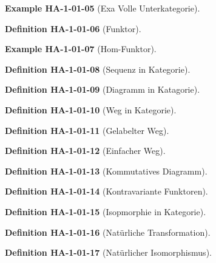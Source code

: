 \documentclass[10pt, letterpaper]{article}
\newcommand{\CustomHeading}[3]{%
  \par\medskip\noindent%
  \textbf{#1 #2} \textnormal{(#3)}.\enskip%
}
\newenvironment{DEF}[2]{\CustomHeading{Definition}{#1}{#2}}{}
\newenvironment{EXA}[2]{\CustomHeading{Example}{#1}{#2}}{}
\begin{document}
\begin{EXA}{HA-1-01-05}{Exa Volle Unterkategorie}
\end{EXA}

\begin{DEF}{HA-1-01-06}{Funktor}
\end{DEF}

\begin{EXA}{HA-1-01-07}{Hom-Funktor}
\end{EXA}

\begin{DEF}{HA-1-01-08}{Sequenz in Kategorie}
\end{DEF}

\begin{DEF}{HA-1-01-09}{Diagramm in Katagorie}
\end{DEF}

\begin{DEF}{HA-1-01-10}{Weg in Kategorie}
\end{DEF}

\begin{DEF}{HA-1-01-11}{Gelabelter Weg}
\end{DEF}

\begin{DEF}{HA-1-01-12}{Einfacher Weg}
\end{DEF}

\begin{DEF}{HA-1-01-13}{Kommutatives Diagramm}
\end{DEF}

\begin{DEF}{HA-1-01-14}{Kontravariante Funktoren}
\end{DEF}

\begin{DEF}{HA-1-01-15}{Isopmorphie in Kategorie}
\end{DEF}

\begin{DEF}{HA-1-01-16}{Natürliche Transformation}
\end{DEF}

\begin{DEF}{HA-1-01-17}{Natürlicher Isomorphismus}
\end{DEF}
\end{document}

